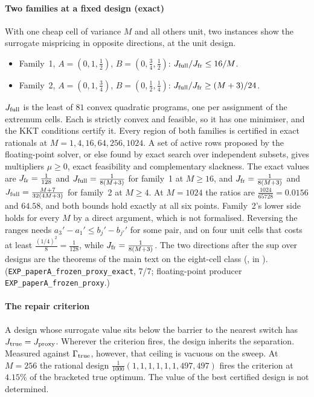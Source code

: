 \paragraph{Two families at a fixed design (exact)} With one cheap cell of variance $M$ and all
others unit, two instances show the surrogate mispricing in opposite directions, at the unit
design.
\begin{itemize}
\item Family~1, $A=(0,1,\frac12)$, $B=(0,\frac34,\frac12)$: $J_{\rm full}/J_{\rm fr}\le16/M$.
\item Family~2, $A=(0,1,\frac34)$, $B=(0,\frac12,\frac14)$: $J_{\rm full}/J_{\rm fr}\ge(M+3)/24$.
\end{itemize}
$J_{\rm full}$ is the least of $81$ convex quadratic programs, one per assignment of the
extremum cells. Each is strictly convex and feasible, so it has one minimiser, and the KKT
conditions certify it. Every region of both families is certified in exact rationals at
$M=1,4,16,64,256,1024$. A set of active rows proposed by the floating-point solver, or else found by
exact search over independent subsets, gives multipliers $\mu\ge0$, exact feasibility and
complementary slackness. The exact values are $J_{\rm fr}=\frac1{128}$ and
$J_{\rm full}=\frac{1}{8(M+3)}$ for family~1 at $M\ge16$, and $J_{\rm fr}=\frac{1}{8(M+3)}$ and
$J_{\rm full}=\frac{M+7}{32(4M+3)}$ for family~2 at $M\ge4$. At $M=1024$ the ratios are
$\frac{1024}{65728}=0.0156$ and $64.58$, and both bounds hold exactly at all six points. \CERT{}
Family~2's lower side holds for every $M$ by a direct argument, which is not formalised.
Reversing the ranges needs $a_{3}'-a_{1}'\le b_{j}'-b_{j'}'$ for some pair, and on four unit cells
that costs at least $\frac{(1/4)^{2}}{8}=\frac1{128}$, while $J_{\rm fr}=\frac1{8(M+3)}$. The two directions after the sup over
designs are the theorems of the main text on the eight-cell class
(,  in
). (\texttt{EXP\_paperA\_frozen\_proxy\_exact}, 7/7; floating-point
producer \texttt{EXP\_paperA\_frozen\_proxy}.)

\paragraph{The repair criterion} A design whose surrogate value sits below the barrier to the
nearest switch has $J_{\rm true}=J_{\rm proxy}$. Wherever the criterion fires, the design
inherits the separation. Measured against $\Gamma_{\rm true}$, however, that ceiling is vacuous on
the sweep. At $M=256$ the rational design $\frac{1}{1000}(1,1,1,1,1,1,497,497)$ fires the
criterion at $4.15\%$ of the bracketed true optimum. \CERT{} The value of the best certified
design is not determined.


